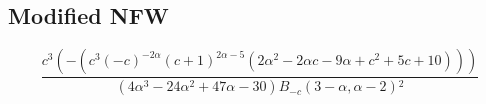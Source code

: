 \subsection{Modified NFW}

\begin{equation}
\frac{c^3 \left(-\left(c^3 (-c)^{-2 \alpha} (c+1)^{2 \alpha-5} \left(2 \alpha^2-2 \alpha c-9 \alpha+c^2+5 c+10\right)\right)\right)}{\left(4 \alpha^3-24 \alpha^2+47 \alpha-30\right) B_{-c}(3-\alpha,\alpha-2){}^2}
\end{equation}